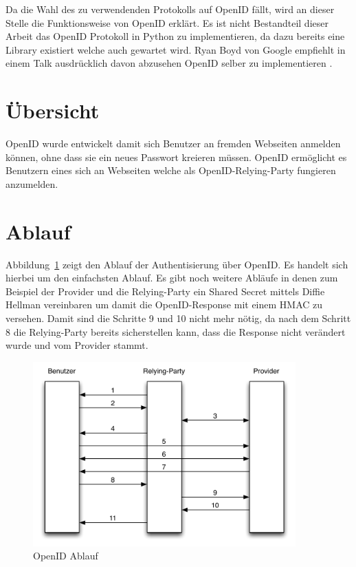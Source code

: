 Da die Wahl des zu verwendenden Protokolls auf OpenID fällt, wird an dieser Stelle die Funktionsweise von OpenID erklärt. Es ist nicht Bestandteil dieser Arbeit das OpenID Protokoll in Python zu implementieren, da dazu bereits eine Library existiert welche auch gewartet wird. Ryan Boyd von Google empfiehlt in einem Talk ausdrücklich davon abzusehen OpenID selber zu implementieren \cite[0:16:08]{googleioopenid}.

\section{Übersicht}
\label{sec:übersicht}
OpenID wurde entwickelt damit sich Benutzer an fremden Webseiten anmelden können, ohne dass sie ein neues Passwort kreieren müssen. OpenID ermöglicht es Benutzern eines  sich an Webseiten welche als \gls{OpenID-Relying-Party} fungieren anzumelden. 

\section{Ablauf}
\label{sec:ablauf}
Abbildung~\ref{fig:openid_ablauf} zeigt den Ablauf der Authentisierung über OpenID. Es handelt sich hierbei um den einfachsten Ablauf. Es gibt noch weitere Abläufe in denen zum Beispiel der Provider und die Relying-Party ein Shared Secret mittels Diffie Hellman\cite{rfc2631} vereinbaren um damit die OpenID-Response mit einem HMAC\cite{rfc2104} zu versehen. Damit sind die Schritte 9 und 10 nicht mehr nötig, da nach dem Schritt 8 die Relying-Party bereits sicherstellen kann, dass die Response nicht verändert wurde und vom Provider stammt.
\begin{figure}[H]
  \centering
	\includegraphics[width=0.9\textwidth]{include/openid1.pdf}
	\caption{OpenID Ablauf}
	\label{fig:openid_ablauf}
\end{figure}

